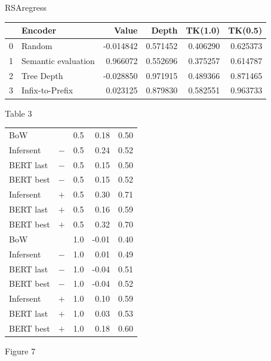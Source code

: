RSAregress

\begin{tabular}{llrrrr}
\toprule
{} &              Encoder &     Value &     Depth &   TK(1.0) &   TK(0.5) \\
\midrule
0 &               Random & -0.014842 &  0.571452 &  0.406290 &  0.625373 \\
1 &  Semantic evaluation &  0.966072 &  0.552696 &  0.375257 &  0.614787 \\
2 &           Tree Depth & -0.028850 &  0.971915 &  0.489366 &  0.871465 \\
3 &      Infix-to-Prefix &  0.023125 &  0.879830 &  0.582551 &  0.963733 \\
\bottomrule
\end{tabular}

Table 3 \label{tab:rsa-natural}

\begin{tabular}{llrrr}

BoW        &          &  0.5  &  0.18  &  0.50  \\
Infersent  &  $-$  &  0.5  &  0.24  &  0.52  \\
BERT last  &  $-$  &  0.5  &  0.15  &  0.50  \\
BERT best  &  $-$  &  0.5  &  0.15  &  0.52  \\
Infersent  &  $+$  &  0.5  &  0.30  &  0.71  \\
BERT last  &  $+$  &  0.5  &  0.16  &  0.59  \\
BERT best  &  $+$  &  0.5  &  0.32  &  0.70  \\
BoW        &          &  1.0  &  -0.01  &  0.40  \\
Infersent  &  $-$  &  1.0  &  0.01  &  0.49  \\
BERT last  &  $-$  &  1.0  &  -0.04  &  0.51  \\
BERT best  &  $-$  &  1.0  &  -0.04  &  0.52  \\
Infersent  &  $+$  &  1.0  &  0.10  &  0.59  \\
BERT last  &  $+$  &  1.0  &  0.03  &  0.53  \\
BERT best  &  $+$  &  1.0  &  0.18  &  0.60  \\
\end{tabular}

Figure 7 \label{fig:bert-layers}

